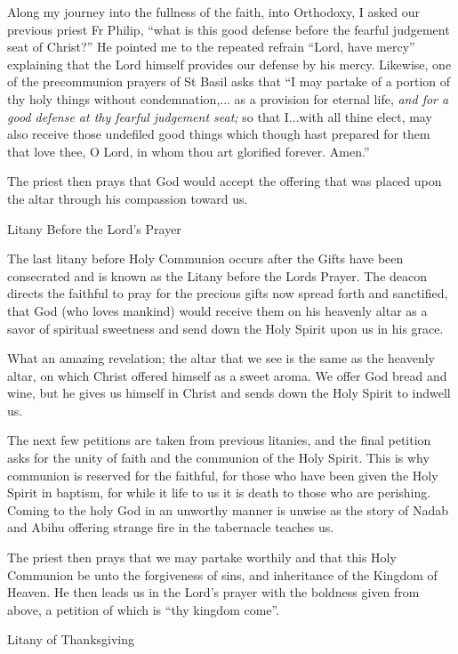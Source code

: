 \documentclass[
]{article}
\begin{document}
Along my journey into the fullness of the faith, into Orthodoxy, I asked
our previous priest Fr Philip, ``what is this good defense before the
fearful judgement seat of Christ?'' He pointed me to the repeated
refrain ``Lord, have mercy'' explaining that the Lord himself provides
our defense by his mercy. Likewise, one of the precommunion prayers of
St Basil asks that ``I may partake of a portion of thy holy things
without condemnation,... as a provision for eternal life, \emph{and for
a good defense at thy fearful judgement seat;} so that I...with all
thine elect, may also receive those undefiled good things which though
hast prepared for them that love thee, O Lord, in whom thou art
glorified forever. Amen.''

The priest then prays that God would accept the offering that was placed
upon the altar through his compassion toward us.

Litany Before the Lord's Prayer

The last litany before Holy Communion occurs after the Gifts have been
consecrated and is known as the Litany before the Lord\textquotesingle s
Prayer. The deacon directs the faithful to pray for the precious gifts
now spread forth and sanctified, that God (who loves mankind) would
receive them on his heavenly altar as a savor of spiritual sweetness and
send down the Holy Spirit upon us in his grace.

What an amazing revelation; the altar that we see is the same as the
heavenly altar, on which Christ offered himself as a sweet aroma. We
offer God bread and wine, but he gives us himself in Christ and sends
down the Holy Spirit to indwell us.

The next few petitions are taken from previous litanies, and the final
petition asks for the unity of faith and the communion of the Holy
Spirit. This is why communion is reserved for the faithful, for those
who have been given the Holy Spirit in baptism, for while it life to us
it is death to those who are perishing. Coming to the holy God in an
unworthy manner is unwise as the story of Nadab and Abihu offering
strange fire in the tabernacle teaches us.

The priest then prays that we may partake worthily and that this Holy
Communion be unto the forgiveness of sins, and inheritance of the
Kingdom of Heaven. He then leads us in the Lord's prayer with the
boldness given from above, a petition of which is ``thy kingdom come''.

Litany of Thanksgiving
\end{document}
